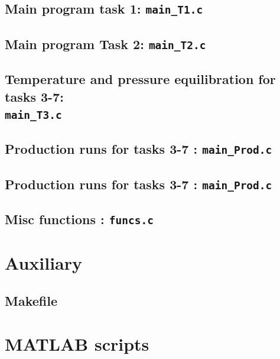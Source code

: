 \subsection{Main program task 1: \texttt{main\_T1.c}}


\subsection{Main program  Task 2: \texttt{main\_T2.c}}


\subsection{Temperature and pressure equilibration for tasks 3-7:\\ \texttt{main\_T3.c}}


\subsection{Production runs for tasks 3-7 : \texttt{main\_Prod.c}}


\subsection{Production runs for tasks 3-7 : \texttt{main\_Prod.c}}



\subsection{Misc functions : \texttt{funcs.c}}


\section{Auxiliary }
\subsection{Makefile}




\section{MATLAB scripts}
